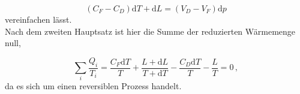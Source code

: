 \begin{equation}
    (C_F - C_D) \mathrm{d}T + \mathrm{d}L = (V_D - V_F) \mathrm{d}p
\end{equation} vereinfachen lässt. \\

Nach dem zweiten Hauptsatz ist hier die Summe der reduzierten Wärmemenge null,

\begin{equation}
    \sum_i \frac{Q_i}{T_i} = \frac{C_F \mathrm{d}T}{T} + \frac{L + \mathrm{d}L}{T + \mathrm{d}T} - \frac{C_D \mathrm{d}T}{T} - \frac{L}{T} = 0 \,,
\end{equation} da es sich um einen reversiblen Prozess handelt.

